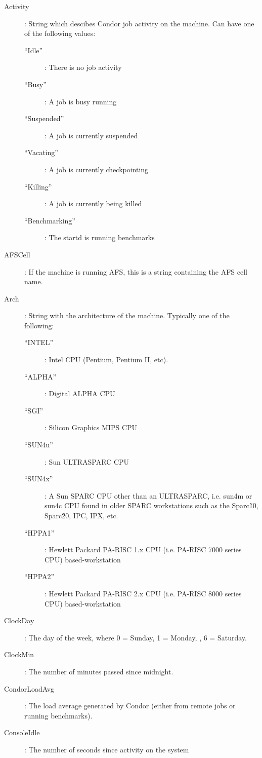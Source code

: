 \begin{description}
%
\item[Activity] : String which descibes Condor job activity on the machine.
Can have one of the following values:
	\begin{description}
	\item[``Idle''] : There is no job activity
	\item[``Busy''] : A job is busy running
	\item[``Suspended''] : A job is currently suspended
	\item[``Vacating''] : A job is currently checkpointing
	\item[``Killing''] : A job is currently being killed
	\item[``Benchmarking''] : The startd is running benchmarks
	\end{description}
%
\item[AFSCell] : If the machine is running AFS, this is a string
containing the AFS cell name.
%
\item[Arch] : String with the architecture of the machine.  Typically
one of the following: 
	\begin{description}
	\item[``INTEL''] : Intel CPU (Pentium, Pentium II, etc).
	\item[``ALPHA''] : Digital ALPHA CPU
	\item[``SGI''] : Silicon Graphics MIPS CPU
	\item[``SUN4u''] : Sun ULTRASPARC CPU
	\item[``SUN4x''] : A Sun SPARC CPU other than an ULTRASPARC, i.e.
sun4m or sun4c CPU found in older SPARC workstations such as the Sparc\~10, 
Sparc\~20, IPC, IPX, etc.
	\item[``HPPA1''] :  Hewlett Packard PA-RISC 1.x CPU (i.e. PA-RISC    
                      7000 series CPU) based-workstation
	\item[``HPPA2''] :  Hewlett Packard PA-RISC 2.x CPU (i.e. PA-RISC    
                      8000 series CPU) based-workstation
	\end{description}
%
\item[ClockDay] : The day of the week, where 0 = Sunday, 1 = Monday, \Dots, 6 = Saturday. 
%
\item[ClockMin] : The number of minutes passed since midnight.
%
\item[CondorLoadAvg] : The load average generated by Condor (either
from remote jobs or running benchmarks).
%
\item[ConsoleIdle] : The number of seconds since activity on the system

\end{description}
